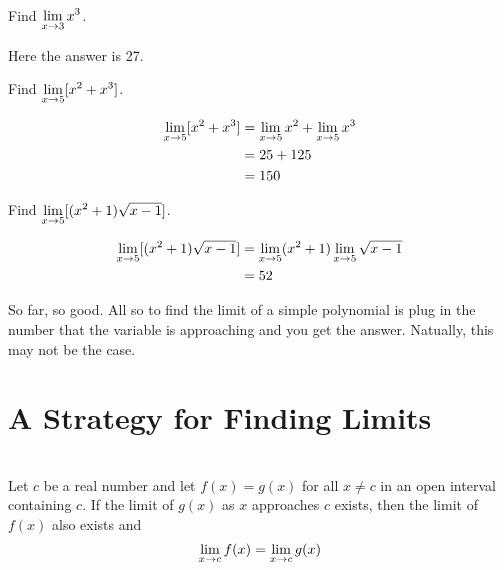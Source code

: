 \begin{example}
    Find $\displaystyle\lim\limits_{x\to 3}x^3$.
    \begin{solution}
        Here the answer is 27.
    \end{solution}
\end{example}
\begin{example}
    Find $\displaystyle\lim\limits_{x\to 5}[x^2+x^3]$.
    \begin{solution}
        \begin{align}
            \displaystyle\lim\limits_{x\to 5}[x^2+x^3]
            &=\displaystyle\lim\limits_{x\to 5}x^2+\displaystyle\lim\limits_{x\to 5}x^3\\
            &=25+125\\
            &=150
        \end{align}
    \end{solution}
\end{example}
\begin{example}
    Find $\displaystyle\lim\limits_{x\to 5}[(x^2+1)\sqrt{x-1}]$.
    \begin{solution}
        \begin{align}
            \displaystyle\lim\limits_{x\to 5}[(x^2+1)\sqrt{x-1}]
            &=\displaystyle\lim\limits_{x\to 5}(x^2+1)\displaystyle\lim\limits_{x\to 5}\sqrt{x-1}\\
            &=52
        \end{align}
    \end{solution}
\end{example}

So far, so good. All so to find the limit of a simple polynomial is plug in the number that the variable is approaching and you get the answer. Natually, this may not be the case.

\section{A Strategy for Finding Limits}

\begin{theorem}
    ~\\
    Let $c$ be a real number and let $f(x)=g(x)$ for all $x\neq c$ in an open interval containing $c$. If the limit of $g(x)$ as $x$ approaches $c$ exists, then the limit of $f(x)$ also exists and
    $$\displaystyle\lim\limits_{x\to c}f(x)=\displaystyle\lim\limits_{x\to c}g(x)$$
    \label{all but one point}
    \\\cite{ci}
\end{theorem}

